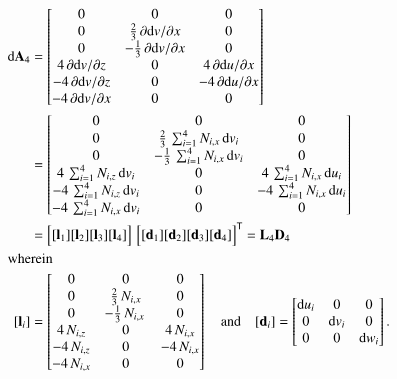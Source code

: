 \begin{subequations}
	\begin{align}
		\mathrm{d} \mathbf{A}_4 & =  \begin{bmatrix}
			0 & 0 &  0   \\
			0 &  \tfrac{2}{3} \, \partial \mathrm{d} v / \partial x & 0  \\
			0 &  - \tfrac{1}{3} \, \partial \mathrm{d} v / \partial x & 0 \\
			4 \, \partial \mathrm{d} v / \partial z &  0 & 4 \, \partial \mathrm{d} u / \partial x  \\
			-4 \, \partial \mathrm{d} v / \partial z &  0 & -4 \, \partial \mathrm{d} u / \partial x  \\
			-4 \, \partial \mathrm{d} v / \partial x &  0 & 0  \end{bmatrix} \notag\\
		& = \begin{bmatrix}
			0 &  0 &  0  \\
			0 &  \tfrac{2}{3} \, \sum\nolimits_{i=1}^4 N_{i,x} \, \mathrm{d} v_i & 0  \\
			0 &  - \tfrac{1}{3} \, \sum\nolimits_{i=1}^4 N_{i,x} \, \mathrm{d} v_i & 0  \\
			4 \, \sum\nolimits_{i=1}^4 N_{i,z} \, \mathrm{d} v_i &  0 & 4 \, \sum\nolimits_{i=1}^4 N_{i,x} \, \mathrm{d} u_i  \\
			-4 \, \sum\nolimits_{i=1}^4 N_{i,z} \, \mathrm{d} v_i &  0 & - 4 \, \sum\nolimits_{i=1}^4 N_{i,x} \, \mathrm{d} u_i  \\
			- 4 \, \sum\nolimits_{i=1}^4 N_{i,x} \, \mathrm{d} v_i &  0 & 0  \end{bmatrix} \notag \\	
		& = \begin{bmatrix}
			[\mathbf{l}_1] [\mathbf{l}_2] [\mathbf{l}_3] [\mathbf{l}_4] 
		\end{bmatrix}  \, \begin{bmatrix} [\mathbf{d}_1] [\mathbf{d}_2] [\mathbf{d}_3] [\mathbf{d}_4] \end{bmatrix}^{\mathsf{T}}
	= \mathbf{L}_4 \mathbf{D}_4 \\
		\intertext{wherein}
		[\mathbf{l}_i] & = \begin{bmatrix}
			0 &  0 &  0  \\
			0 &  \tfrac{2}{3} \, N_{i,x}  & 0  \\
			0 &  - \tfrac{1}{3} \,  N_{i,x} \,  & 0  \\
			4 \,  N_{i,z}  &  0 & 4 \,  N_{i,x}   \\
			-4 \,  N_{i,z} &  0 & - 4 \,  N_{i,x}  \\
			- 4 \,  N_{i,x} &  0 & 0  \end{bmatrix}   \quad \text{and} \quad	[\mathbf{d}_i] = \begin{bmatrix}
			\mathrm{d} u_i & 0  & 0  \\
			0 &  \mathrm{d} v_i   & 0  \\
			0 & 0 & \mathrm{d} w_i \end{bmatrix} .
	\end{align}
\end{subequations}

